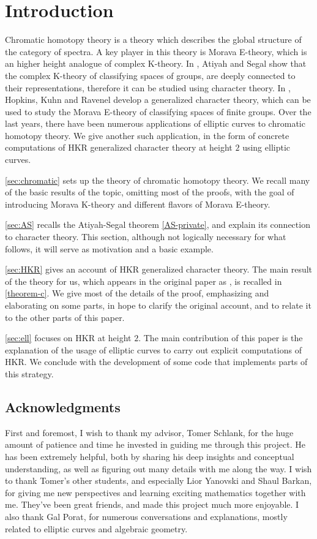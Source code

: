 \section{Introduction}

Chromatic homotopy theory is a theory which describes the global structure of the category of spectra.
A key player in this theory is Morava E-theory, which is an higher height analogue of complex K-theory.
In \cite{AS}, Atiyah and Segal show that the complex K-theory of classifying spaces of groups, are deeply connected to their representations, therefore it can be studied using character theory.
In \cite{HKR}, Hopkins, Kuhn and Ravenel develop a generalized character theory, which can be used to study the Morava E-theory of classifying spaces of finite groups.
Over the last years, there have been numerous applications of elliptic curves to chromatic homotopy theory.
We give another such application, in the form of concrete computations of HKR generalized character theory at height $2$ using elliptic curves.

\cref{sec:chromatic} sets up the theory of chromatic homotopy theory.
We recall many of the basic results of the topic, omitting most of the proofs, with the goal of introducing Morava K-theory and different flavors of Morava E-theory.

\cref{sec:AS} recalls the Atiyah-Segal theorem \ref{AS-private}, and explain its connection to character theory.
This section, although not logically necessary for what follows, it will serve as motivation and a basic example.

\cref{sec:HKR} gives an account of HKR generalized character theory.
The main result of the theory for us, which appears in the original paper as \cite[Theorem C]{HKR}, is recalled in \cref{theorem-c}.
We give most of the details of the proof, emphasizing and elaborating on some parts, in hope to clarify the original account, and to relate it to the other parts of this paper.

\cref{sec:ell} focuses on HKR at height $2$.
The main contribution of this paper is the explanation of the usage of elliptic curves to carry out explicit computations of HKR.
We conclude with the development of some code that implements parts of this strategy.



\subsection*{Acknowledgments}

First and foremost, I wish to thank my advisor, Tomer Schlank, for the huge amount of patience and time he invested in guiding me through this project.
He has been extremely helpful, both by sharing his deep insights and conceptual understanding, as well as figuring out many details with me along the way.
I wish to thank Tomer's other students, and especially Lior Yanovski and Shaul Barkan, for giving me new perspectives and learning exciting mathematics together with me.
They've been great friends, and made this project much more enjoyable.
I also thank Gal Porat, for numerous conversations and explanations, mostly related to elliptic curves and algebraic geometry.